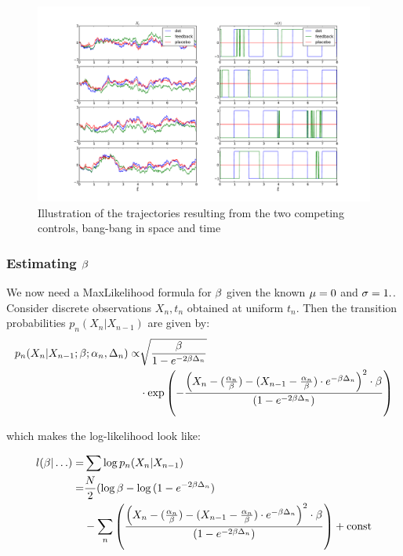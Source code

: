 \begin{figure}[htp]
\begin{center}
  \includegraphics[width=1\textwidth]{Figs/OU_MIControlSimulator/det_vs_fb_amax1.pdf}
  \caption[labelInTOC]{Illustration of the trajectories resulting from the two 
  competing  controls, bang-bang in space and time}
  \label{fig:trajectories_bang_bang_time_vs_space}
\end{center}
\end{figure}



\subsubsection{Estimating $\beta$}
We now need a MaxLikelihood formula for $\beta$ given the known ${\mu } =0 $ and $\sigma =
1.$. 
Consider discrete observations ${X_n, t_n}$ obtained at uniform
$t_n$.
Then the transition probabilities $p_n(X_n|X_{n-1})$ are given by:
\begin{align*}
p_n(X_n|X_{n-1}; \beta; \alpha_n, \Delta_n) \propto &
\sqrt{ \frac{\beta}{ 1 -  e^{-2\beta \Delta_n}}}
\\ &\cdot 
\exp\left(-\frac{\left( X_n - (\frac {\alpha_n}{\beta} )  - (X_{n-1} -
	 \frac {\alpha_n}{\beta}) \cdot e^{-\beta \Delta_n} \right)^2 \cdot \beta}
			{ (1-e^{-2\beta\Delta_n})} \right)
\end{align*} 


which makes the log-likelihood look like:

\begin{align*}
l( \beta|\ldots) = & \sum \log p_n(X_n|X_{n-1})
\\
=& \frac{N}{2} (\log \beta - \log{ (1-e^{-2\beta\Delta_n})}
\\ & -\sum_n
{\left(\frac{\left( X_n - (\frac {\alpha_n}{\beta} )  - (X_{n-1} -
	 \frac {\alpha_n}{\beta}) \cdot e^{-\beta \Delta_n} \right)^2 \cdot \beta}
			{ (1-e^{-2\beta\Delta_n})} \right)}	 + { \mathrm{const} }		
\end{align*}

